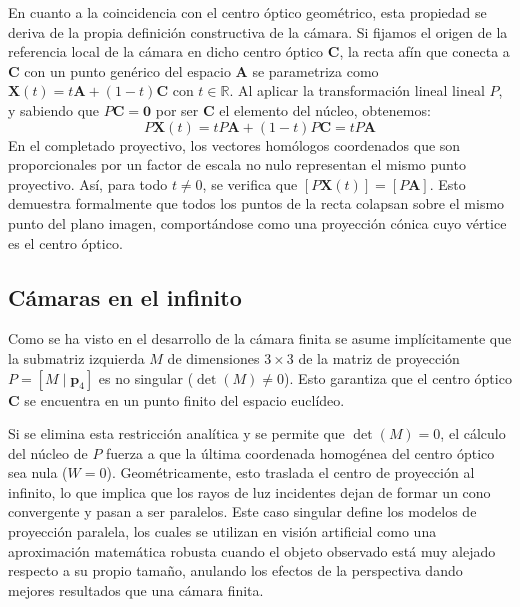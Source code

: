 \documentclass[
10pt, %
a4paper, %
oneside, %
headinclude,footinclude, %
BCOR=5mm, %
]{scrartcl}
\begin{document}
En cuanto a la coincidencia con el centro óptico geométrico, esta propiedad se deriva de la propia definición constructiva de la cámara. Si fijamos el origen de la referencia local de la cámara en dicho centro óptico $\mathbf{C}$, la recta afín que conecta a $\mathbf{C}$ con un punto genérico del espacio $\mathbf{A}$ se parametriza como $\mathbf{X}(t) = t\mathbf{A} + (1-t)\mathbf{C}$ con $t \in \mathbb{R}$. Al aplicar la transformación lineal lineal $P$, y sabiendo que $P\mathbf{C} = \mathbf{0}$ por ser $\mathbf{C}$ el elemento del núcleo, obtenemos:
\[
    P\mathbf{X}(t) = tP\mathbf{A} + (1-t)P\mathbf{C} = tP\mathbf{A}
    \]
En el completado proyectivo, los vectores homólogos coordenados que son proporcionales por un factor de escala no nulo representan el mismo punto proyectivo. Así, para todo $t \neq 0$, se verifica que $[P\mathbf{X}(t)] = [P\mathbf{A}]$. Esto demuestra formalmente que todos los puntos de la recta colapsan sobre el mismo punto del plano imagen, comportándose como una proyección cónica cuyo vértice es el centro óptico.

\subsection{Cámaras en el infinito}

Como se ha visto en el desarrollo de la cámara finita se asume implícitamente que la submatriz izquierda $M$ de dimensiones $3 \times 3$ de la matriz de proyección $P = [M \mid \mathbf{p}_4]$ es no singular ($\det(M) \neq 0$). Esto garantiza que el centro óptico $\mathbf{C}$ se encuentra en un punto finito del espacio euclídeo.

Si se elimina esta restricción analítica y se permite que $\det(M) = 0$, el cálculo del núcleo de $P$ fuerza a que la última coordenada homogénea del centro óptico sea nula ($W=0$). Geométricamente, esto traslada el centro de proyección al infinito, lo que implica que los rayos de luz incidentes dejan de formar un cono convergente y pasan a ser paralelos. Este caso singular define los modelos de proyección paralela, los cuales se utilizan en visión artificial como una aproximación matemática robusta cuando el objeto observado está muy alejado respecto a su propio tamaño, anulando los efectos de la perspectiva dando mejores resultados que una cámara finita.
\end{document}
